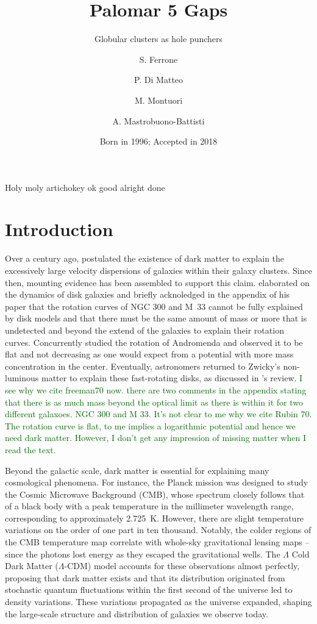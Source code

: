 \documentclass[draft]{aa}
\title{Palomar 5 Gaps}
\subtitle{Globular clusters as hole punchers}
\author{S. Ferrone
       \inst{1,2}
       \and
       P. Di Matteo\inst{2}
       \and
       M. Montuori\inst{1}
       \and
       A. Mastrobuono-Battisti
       }
\institute{Dipartimento di Fisica, Universit\`a di Roma ``La Sapienza'',
           Piazza Aldo Moro\\
           \email{salvatore.ferrone@uniroma1.it}
      \and
          Paris Observatory. Paris Sciences et Lettres\\
          \email{c.ptolemy@hipparch.uheaven.space}
          \thanks{The university of heaven temporarily does not
                  accept e-mails}
          }
\date{Born in 1996; Accepted in 2018}
\newcommand{\salvatore}[1]{\textcolor{darkgreen}{{#1}}}
\begin{document}
\abstract
  {Holy moly artichokey}
  {ok}
  {good}
  {alright}
  {done}


\maketitle
\section{Introduction}


  Over a century ago, \citet{1933AcHPh...6..110Z} postulated the existence of dark matter to explain the excessively large velocity dispersions of galaxies within their galaxy clusters. Since then, mounting evidence has been assembled to support this claim. \citet{1970IAUS...38..351F,1970ApJ...161..802F} elaborated on the dynamics of disk galaxies and briefly acknoledged in the appendix of his paper that the rotation curves of NGC 300 and M~33 cannot be fully explained by disk models and that there must be the same amount of mass or more that is undetected and beyond the extend of the galaxies to explain their rotation curves. Concurrently \citet{1970ApJ...159..379R} studied the rotation of Andromenda and observed it to be flat and not decreasing as one would expect from a potential with more mass concentration in the center. Eventually, astronomers returned to Zwicky's non-luminous matter to explain these fast-rotating disks, as discussed in \citet{1983SciAm.248f..96R}'s review. \salvatore{I see why we cite freeman70 now. there are two comments in the appendix stating that there is as much mass beyond the optical limit as there is within it for two different galaxoes. NGC 300 and M 33. It's not clear to me why we cite Rubin 70. The rotation curve is flat, to me implies a logarithmic potential and hence we need dark matter. However, I don't get any impression of missing matter when I read the text.}


  Beyond the galactic scale, dark matter is essential for explaining many cosmological phenomena. For instance, the Planck mission \citep{2020A&A...641A...1P} was designed to study the Cosmic Microwave Background (CMB), whose spectrum closely follows that of a black body with a peak temperature in the millimeter wavelength range, corresponding to approximately 2.725~K. However, there are slight temperature variations on the order of one part in ten thousand. Notably, the colder regions of the CMB temperature map correlate with whole-sky gravitational lensing maps \citep{2020A&A...641A...8P}--since the photons lost energy as they escaped the gravitational wells. The $\Lambda$ Cold Dark Matter ($\Lambda$-CDM) model accounts for these observations almost perfectly, proposing that dark matter exists and that its distribution originated from stochastic quantum fluctuations within the first second of the universe led to density variations. These variations propagated as the universe expanded, shaping the large-scale structure and distribution of galaxies we observe today.
\end{document}

